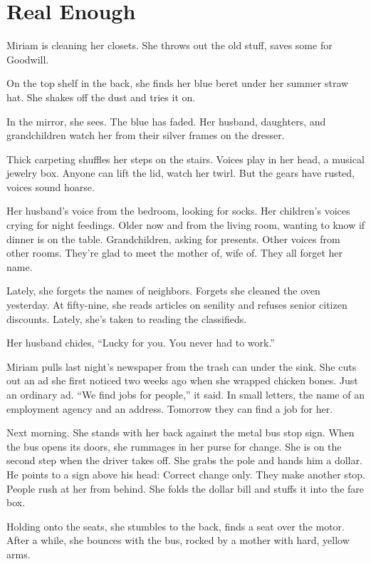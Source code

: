 \documentclass[twoside,10pt]{book}
\begin{document}
\cleardoublepage
\chapter{Real Enough}

Miriam is cleaning her closets. She throws out the old stuff, saves some
for Goodwill.

On the top shelf in the back, she finds her blue beret under her summer
straw hat. She shakes off the dust and tries it on.

In the mirror, she sees. The blue has faded. Her husband, daughters, and
grandchildren watch her from their silver frames on the dresser.

Thick carpeting shuffles her steps on the stairs. Voices play in her
head, a musical jewelry box. Anyone can lift the lid, watch her twirl.
But the gears have rusted, voices sound hoarse.

Her husband's voice from the bedroom, looking for socks. Her children's
voices crying for night feedings. Older now and from the living room,
wanting to know if dinner is on the table. Grand­children, asking for
presents. Other voices from other rooms. They're glad to meet the mother
of, wife of. They all forget her name.

Lately, she forgets the names of neighbors. Forgets she cleaned the oven
yesterday. At fifty-nine, she reads articles on senility and refuses
senior citizen discounts. Lately, she's taken to reading the
classifieds.

Her husband chides, ``Lucky for you. You never had to work.''

Miriam pulls last night's newspaper from the trash can under the sink.
She cuts out an ad she first noticed two weeks ago when she wrapped
chicken bones. Just an ordinary ad. ``We find jobs for people,'' it
said. In small letters, the name of an employment agency and an address.
Tomorrow they can find a job for her.

Next morning. She stands with her back against the metal bus stop sign.
When the bus opens its doors, she rummages in her purse for change. She
is on the second step when the driver takes off. She grabs the pole and
hands him a dollar. He points to a sign above his head: Correct change
only. They make another stop. People rush at her from behind. She folds
the dollar bill and stuffs it into the fare box.

Holding onto the seats, she stumbles to the back, finds a seat over the
motor. After a while, she bounces with the bus, rocked by a mother with
hard, yellow arms.
\end{document}
